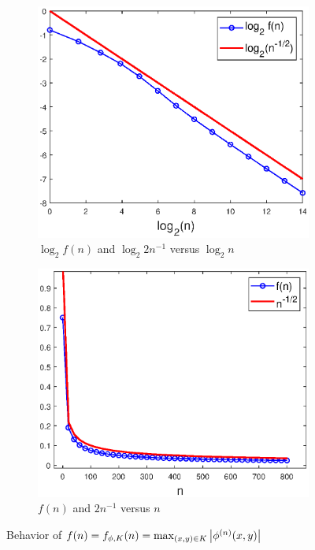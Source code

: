 \documentclass[11pt, letter]{book}
\newenvironment{example}
  {\pushQED{\qed}\renewcommand{\qedsymbol}{$\triangle$}\examplex}
  {\popQED\endexamplex}
\begin{document}
\begin{example}
\begin{figure}[!htb]
    \begin{subfigure}{0.49\textwidth}
    \centering
    \includegraphics[scale=0.58]{Fig5a.eps}
    \caption{$\log_2 f(n)$ and $\log_2 2n^{-1}$ versus $\log_2 n$}
    \end{subfigure}
    \begin{subfigure}{0.49\textwidth}
    \centering
    \includegraphics[scale=0.58]{Fig5b.eps}
    \caption{$f(n)$ and $2n^{-1}$ versus $n$}
    \end{subfigure}
    \caption{Behavior of $f(n)=f_{\phi,K}(n)=\max_{(x,y)\in K}\abs{\phi^{(n)}(x,y)}$}
    \label{fig:Conv_Pwr_0}
\end{figure}





\end{example}
\end{document}
